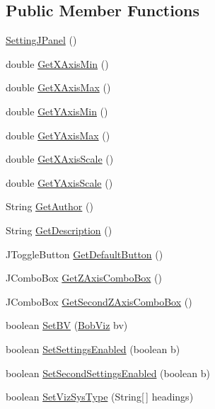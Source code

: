 \subsection*{Public Member Functions}
\begin{DoxyCompactItemize}
\item 
\hyperlink{class_setting_j_panel_af17c3f4ba101c659fe9eaa7dc6ee7f27}{Setting\-J\-Panel} ()
\item 
double \hyperlink{class_setting_j_panel_a19038ce15f6c0a2a835981e04dd0e3e2}{Get\-X\-Axis\-Min} ()
\item 
double \hyperlink{class_setting_j_panel_ad444ca2c7161cdfb906d1ddeebb5ff23}{Get\-X\-Axis\-Max} ()
\item 
double \hyperlink{class_setting_j_panel_ab7d2ee01bcbb7c2565f987ce4ad7f8a6}{Get\-Y\-Axis\-Min} ()
\item 
double \hyperlink{class_setting_j_panel_abc0018346df79e2c333fceb8100d73ad}{Get\-Y\-Axis\-Max} ()
\item 
double \hyperlink{class_setting_j_panel_af5c40b9861c4f1af69c78beea105ce70}{Get\-X\-Axis\-Scale} ()
\item 
double \hyperlink{class_setting_j_panel_ad8649c6a06816c500e46ac7e2f983de4}{Get\-Y\-Axis\-Scale} ()
\item 
String \hyperlink{class_setting_j_panel_ad77ebfe5f6684e358d613cb3e0daed49}{Get\-Author} ()
\item 
String \hyperlink{class_setting_j_panel_aa830d6ccb04cfe19429b22119a52c127}{Get\-Description} ()
\item 
J\-Toggle\-Button \hyperlink{class_setting_j_panel_ab9c3cb39831c331a8a8a041655348cc7}{Get\-Default\-Button} ()
\item 
J\-Combo\-Box \hyperlink{class_setting_j_panel_ab4d6bc8c6213d9ccaf93509ad43a9a7c}{Get\-Z\-Axis\-Combo\-Box} ()
\item 
J\-Combo\-Box \hyperlink{class_setting_j_panel_af85c5475c2586ace4c6adfaf7c63c708}{Get\-Second\-Z\-Axis\-Combo\-Box} ()
\item 
boolean \hyperlink{class_setting_j_panel_aabfaa9fb1f2cfc91197b0b5cf10e538d}{Set\-B\-V} (\hyperlink{class_bob_viz}{Bob\-Viz} bv)
\item 
boolean \hyperlink{class_setting_j_panel_a0867f721026a690933334532d59fd1c0}{Set\-Settings\-Enabled} (boolean b)
\item 
boolean \hyperlink{class_setting_j_panel_af44d07f356aa8217418fe0878a50f48d}{Set\-Second\-Settings\-Enabled} (boolean b)
\item 
boolean \hyperlink{class_setting_j_panel_afb2b0736bdf6a8a724066b4a7c78a25f}{Set\-Viz\-Sys\-Type} (String\mbox{[}$\,$\mbox{]} headings)

\end{DoxyCompactItemize}
